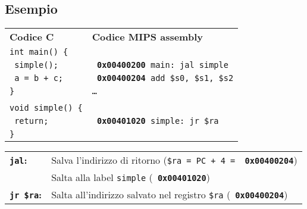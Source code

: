 \documentclass[../main.tex]{subfiles}
\begin{document}
\subsection*{Esempio}
\begin{tabular}{ p{8cm} p{8cm} }
    \textbf{Codice C} & \textbf{Codice MIPS assembly} \\
    \texttt{int main() \{} \\
    \texttt{\hspace*{0cm} \hspace*{0cm} \hspace*{0cm} \hspace*{0cm} simple();} & \texttt{{\color{black} \textbf{0x00400200}} main: jal simple} \\
    \texttt{\hspace*{0cm} \hspace*{0cm} \hspace*{0cm} \hspace*{0cm} a = b + c;} & \texttt{{\color{red} \textbf{0x00400204}} add \$s0, \$s1, \$s2} \\
    \texttt{\}} & \texttt{\dots} \\
    \\
    \texttt{void simple() \{} \\
    \texttt{\hspace*{0cm} \hspace*{0cm} \hspace*{0cm} \hspace*{0cm} return;} & \texttt{{\color{blue} \textbf{0x00401020}} simple: jr \$ra} \\
    \texttt{\}} \\
\end{tabular}

\vspace*{5mm}

\noindent
\begin{tabular}{ l l }
    \textbf{\texttt{jal}:} & Salva l'indirizzo di ritorno (\texttt{\$ra = PC + 4 = {\color{red} \textbf{0x00400204}}}) \\
    & Salta alla label \texttt{simple} (\texttt{{\color{blue} \textbf{0x00401020}}}) \\
    \textbf{\texttt{jr \$ra}:} & Salta all'indirizzo salvato nel registro \texttt{\$ra} (\texttt{{\color{red} \textbf{0x00400204}}}) \\
\end{tabular}

\vspace*{1cm}
\end{document}
